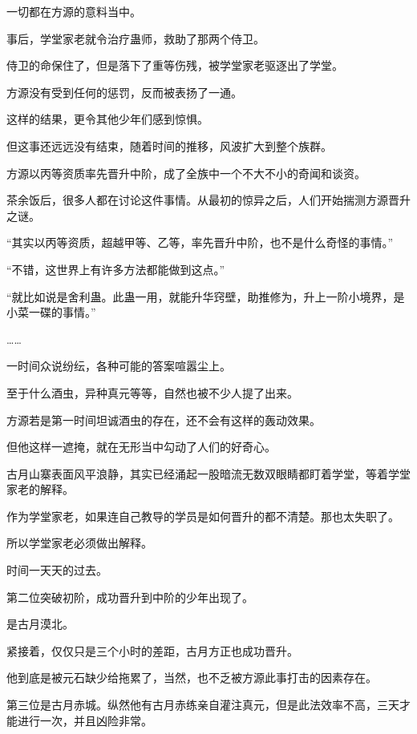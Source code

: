 
\begin{this_body}

一切都在方源的意料当中。

事后，学堂家老就令治疗蛊师，救助了那两个侍卫。

侍卫的命保住了，但是落下了重等伤残，被学堂家老驱逐出了学堂。

方源没有受到任何的惩罚，反而被表扬了一通。

这样的结果，更令其他少年们感到惊惧。

但这事还远远没有结束，随着时间的推移，风波扩大到整个族群。

方源以丙等资质率先晋升中阶，成了全族中一个不大不小的奇闻和谈资。

茶余饭后，很多人都在讨论这件事情。从最初的惊异之后，人们开始揣测方源晋升之谜。

“其实以丙等资质，超越甲等、乙等，率先晋升中阶，也不是什么奇怪的事情。”

“不错，这世界上有许多方法都能做到这点。”

“就比如说是舍利蛊。此蛊一用，就能升华窍壁，助推修为，升上一阶小境界，是小菜一碟的事情。”

……

一时间众说纷纭，各种可能的答案喧嚣尘上。

至于什么酒虫，异种真元等等，自然也被不少人提了出来。

方源若是第一时间坦诚酒虫的存在，还不会有这样的轰动效果。

但他这样一遮掩，就在无形当中勾动了人们的好奇心。

古月山寨表面风平浪静，其实已经涌起一股暗流无数双眼睛都盯着学堂，等着学堂家老的解释。

作为学堂家老，如果连自己教导的学员是如何晋升的都不清楚。那也太失职了。

所以学堂家老必须做出解释。

时间一天天的过去。

第二位突破初阶，成功晋升到中阶的少年出现了。

是古月漠北。

紧接着，仅仅只是三个小时的差距，古月方正也成功晋升。

他到底是被元石缺少给拖累了，当然，也不乏被方源此事打击的因素存在。

第三位是古月赤城。纵然他有古月赤练亲自灌注真元，但是此法效率不高，三天才能进行一次，并且凶险非常。


\end{this_body}
